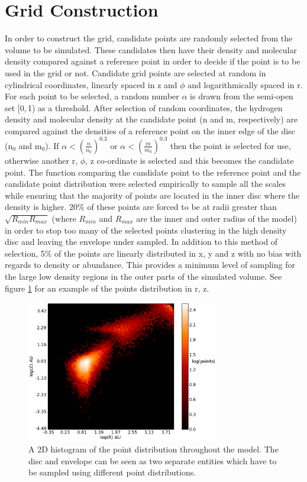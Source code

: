\documentclass[useAMS,usenatbib]{mn2e}
\begin{document}
 


\appendix

\section{Grid Construction} \label{sec:gridding} 

In order to construct the grid, candidate points are randomly selected from the volume to be simulated. These candidates then have their density and molecular density compared against a reference point in order to decide if the point is to be used in the grid or not. Candidate grid points are selected at random in cylindrical coordinates, linearly spaced in z and $\phi$ and logarithmically spaced in r. For each point to be selected, a random number $\alpha$ is drawn from the semi-open set [0,$\,$1) as a threshold. After selection of random coordinates, the hydrogen density and molecular density at the candidate point (n and m, respectively) are compared against the densities of a reference point on the inner edge of the disc (n$_0$ and m$_0$). If $\alpha<\left( \frac{n}{n_0} \right)^{0.3}$ or $\alpha< \left( \frac{m}{m_0} \right)^{0.3}$ then the point is selected for use, otherwise another r, $\phi$, z co-ordinate is selected and this becomes the candidate point. The function comparing the candidate point to the reference point and the candidate point distribution were selected empirically to sample all the scales while ensuring that the majority of points are located in the inner disc where the density is higher. 20\% of these points are forced to be at radii greater than $\sqrt{R_{min}R_{max}}$ (where $R_{min}$ and $R_{max}$ are the inner and outer radius of the model) in order to stop too many of the selected points clustering in the high density disc and leaving the envelope under sampled. In addition to this method of selection, 5\% of the points are linearly distributed in x, y and z with no bias with regards to density or abundance. This provides a minimum level of sampling for the large low density regions in the outer parts of the simulated volume. See figure \ref{points} for an example of the points distribution in r, z. \smallskip

\begin{figure}
 \includegraphics[width=84mm]{Figures/model/lime_points_rz_histo2.eps}
 \caption{A 2D histogram of the point distribution throughout the model. The disc and envelope can be seen as two separate entities which have to be sampled using different point distributions.}
 \label{points}
\end{figure}
\end{document}
